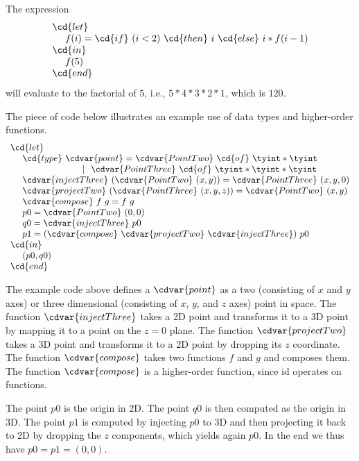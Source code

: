 \begin{example}
The expression
%
\[
\begin{array}{l}
\cd{let}\\
~~~~f(i) = \cd{if} ~(i < 2) ~\cd{then}~ i ~\cd{else}~ i  * 
f(i - 1) \\
\cd{in} \\ 
~~~~f(5) \\
\cd{end} 
\end{array}
\]
will evaluate to the factorial of $5$, i.e., $5 * 4 * 3 * 2
* 1$, which is $120$.
\end{example}

\begin{example}
The piece of code below illustrates an example use of data types and
higher-order functions.
%
\[
\begin{array}{l}
\cd{let}
\\ 
~~~~\cd{type}~\cdvar{point} = \cdvar{PointTwo}~\cd{of}~\tyint * \tyint
\\ 
~~~~~~~~~~~~~~~~~~~~~~~~|~~\cdvar{PointThree}~\cd{of}~ \tyint * \tyint * \tyint
\\
~~~~\cdvar{injectThree}~(\cdvar{PointTwo}~(x, y)) = \cdvar{PointThree}~(x, y, 0)
\\  
~~~~\cdvar{projectTwo}~(\cdvar{PointThree}~(x, y, z)) = \cdvar{PointTwo}~(x, y)
\\ 
~~~~\cdvar{compose}~f~g = f~g  
\\
~~~~p0 = \cdvar{PointTwo}~(0,0)
\\
~~~~q0 = \cdvar{injectThree}~p0
\\
~~~~p1 = (\cdvar{compose}~\cdvar{projectTwo}~\cdvar{injectThree})~p0
\\
\cd{in} 
\\
~~~~(p0, q0)
\\
\cd{end}
\end{array}
\]

The example code above defines a $\cdvar{point}$ as a two (consisting of
$x$ and $y$ axes) or three dimensional (consisting of $x$, $y$, and
$z$ axes) point in space.
%
The function $\cdvar{injectThree}$ takes a 2D point and transforms it to a 3D
point by mapping it to a point on the $z=0$ plane. 
%
The function $\cdvar{projectTwo}$ takes a 3D point and transforms it to a 2D
point by dropping its $z$ coordinate.
%
The function $\cdvar{compose}$ takes two functions $f$ and $g$ and composes
them.
%
The function $\cdvar{compose}$ is a higher-order function, since id operates
on functions.

The point $p0$ is the origin in 2D.  The point $q0$ is then computed
as the origin in 3D.  The point $p1$ is computed by injecting $p0$ to
3D and then projecting it back to 2D by dropping the $z$ components,
which yields again $p0$.  
%
In the end we thus have $p0 = p1 = (0,0)$. 

\end{example}


